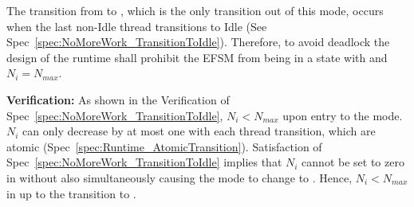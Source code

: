 \documentclass{article}
\begin{document}
\begin{spec}
\label{spec:NoMoreWork_NeedThread}
The transition from {\TeamRunningNoMoreWork} to \TeamIdle, which is the only
transition out of this mode, occurs when the last non-Idle thread transitions to
Idle (See Spec~\ref{spec:NoMoreWork_TransitionToIdle}).  Therefore, to avoid
deadlock the design of the runtime shall prohibit the EFSM from being in a state
with {\TeamRunningNoMoreWork} and $N_i = N_{max}$.
\end{spec}
\textbf{Verification:}\hspace{0.125in} As shown in the Verification of
Spec~\ref{spec:NoMoreWork_TransitionToIdle},  $N_i < N_{max}$ upon entry to the
mode. $N_i$ can only decrease by at most one with each thread transition,
which are atomic (Spec~\ref{spec:Runtime_AtomicTransition}). Satisfaction of
Spec~\ref{spec:NoMoreWork_TransitionToIdle} implies that $N_i$ cannot be set to
zero in {\TeamRunningNoMoreWork} without also simultaneously causing the mode to
change to \TeamIdle.  Hence, $N_i < N_{max}$ in {\TeamRunningNoMoreWork} up to
the transition to \TeamIdle.
\end{document}
